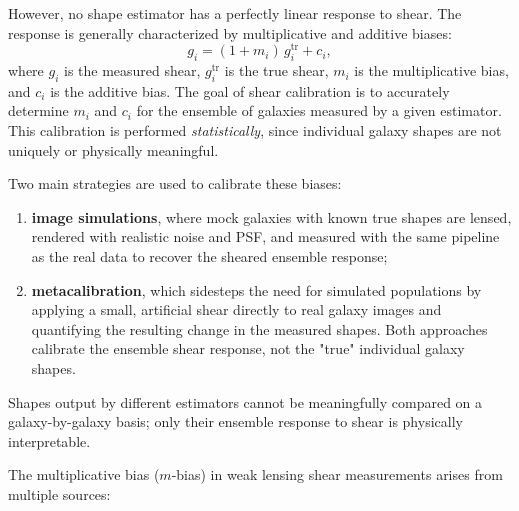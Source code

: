\medskip

However, no shape estimator has a perfectly linear response to shear. The response is generally characterized by multiplicative and additive biases:
$$
g_i = (1+m_i)\, g_i^{\text{tr}} + c_i ,
$$
where $g_i$ is the measured shear, $g_i^{\text{tr}}$ is the true shear, $m_i$ is the multiplicative bias, and $c_i$ is the additive bias. The goal of shear calibration is to accurately determine $m_i$ and $c_i$ for the ensemble of galaxies measured by a given estimator. This calibration is performed \emph{statistically}, since individual galaxy shapes are not uniquely or physically meaningful.

\medskip

Two main strategies are used to calibrate these biases:

\begin{enumerate}

    \item \textbf{image simulations}, where mock galaxies with known true shapes are lensed, rendered with realistic noise and PSF, and measured with the same pipeline as the real data to recover the sheared ensemble response;
    \item \textbf{metacalibration}, which sidesteps the need for simulated populations by applying a small, artificial shear directly to real galaxy images and quantifying the resulting change in the measured shapes. Both approaches calibrate the ensemble shear response, not the "true" individual galaxy shapes.
\end{enumerate}
    
\begin{warningblock}
    Shapes output by different estimators cannot be meaningfully compared on a galaxy-by-galaxy basis; only their ensemble response to shear is physically interpretable.
\end{warningblock}

\medskip

The multiplicative bias ($m$-bias) in weak lensing shear measurements arises from multiple sources:

\medskip

